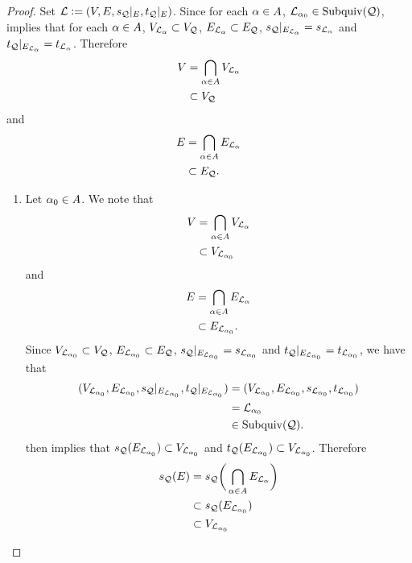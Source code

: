 \documentclass{book}
\begin{document}
	\begin{proof}
		Set $\mathcal{L} \vcentcolon= (V, E, s_{\mathcal{Q}}|_E, t_{\mathcal{Q}}|_E)$. Since for each $\alpha \in A$, $\mathcal{L}_{\alpha_0} \in \operatorname{Subquiv}(\mathcal{Q})$,  implies that for each $\alpha \in A$, $V_{\mathcal{L}_{\alpha}} \subset V_{\mathcal{Q}}$, $E_{\mathcal{L}_{\alpha}} \subset E_{\mathcal{Q}}$, $s_{\mathcal{Q}}|_{E_{\mathcal{L}_{\alpha}}} = s_{\mathcal{L}_{\alpha}}$ and $t_{\mathcal{Q}}|_{E_{\mathcal{L}_{\alpha}}} = t_{\mathcal{L}_{\alpha}}$. Therefore 
		\begin{align*}
			V
			& = \bigcap\limits_{\alpha \in A} V_{\mathcal{L}_{\alpha}} \\
			& \subset V_{\mathcal{Q}} 
		\end{align*}
		and 
		\begin{align*}
			E
			& = \bigcap\limits_{\alpha \in A} E_{\mathcal{L}_{\alpha}} \\
			& \subset E_{\mathcal{Q}}.
		\end{align*}
		\begin{enumerate}
			\item  
			Let $\alpha_0 \in A$. We note that 
			\begin{align*}
				V
				& = \bigcap\limits_{\alpha \in A} V_{\mathcal{L}_{\alpha}} \\
				& \subset V_{\mathcal{L}_{\alpha_0}} 
			\end{align*} 
			and 
			\begin{align*}
				E
				& = \bigcap\limits_{\alpha \in A} E_{\mathcal{L}_{\alpha}} \\
				& \subset E_{\mathcal{L}_{\alpha_0}}.
			\end{align*} 
			Since $V_{\mathcal{L}_{\alpha_0}} \subset V_{\mathcal{Q}}$, $E_{\mathcal{L}_{\alpha_0}} \subset E_{\mathcal{Q}}$, $s_{\mathcal{Q}}|_{E_{\mathcal{L}_{\alpha_0}}} = s_{\mathcal{L}_{\alpha_0}}$ and $t_{\mathcal{Q}}|_{E_{\mathcal{L}_{\alpha_0}}} = t_{\mathcal{L}_{\alpha_0}}$, we have that
			\begin{align*}
				(V_{\mathcal{L}_{\alpha_0}}, E_{\mathcal{L}_{\alpha_0}}, s_{\mathcal{Q}}|_{E_{\mathcal{L}_{\alpha_0}}}, t_{\mathcal{Q}}|_{E_{\mathcal{L}_{\alpha_0}}})
				& = (V_{\mathcal{L}_{\alpha_0}}, E_{\mathcal{L}_{\alpha_0}}, s_{\mathcal{L}_{\alpha_0}}, t_{\mathcal{L}_{\alpha_0}}) \\
				& = \mathcal{L}_{\alpha_0} \\
				& \in \operatorname{Subquiv}(\mathcal{Q}).
			\end{align*}
			 then implies that $s_{\mathcal{Q}}(E_{\mathcal{L}_{\alpha_0}}) \subset V_{\mathcal{L}_{\alpha_0}}$ and $t_{\mathcal{Q}}(E_{\mathcal{L}_{\alpha_0}}) \subset V_{\mathcal{L}_{\alpha_0}}$. Therefore
			\begin{align*}
				s_{\mathcal{Q}}(E) 
				& = s_{\mathcal{Q}} \bigg( \bigcap\limits_{\alpha \in A} E_{\mathcal{L}_{\alpha}} \bigg) \\
				& \subset s_{\mathcal{Q}}(E_{\mathcal{L}_{\alpha_0}}) \\
				& \subset V_{\mathcal{L}_{\alpha_0}}
			\end{align*}

\end{enumerate}
\end{proof}
\end{document}
